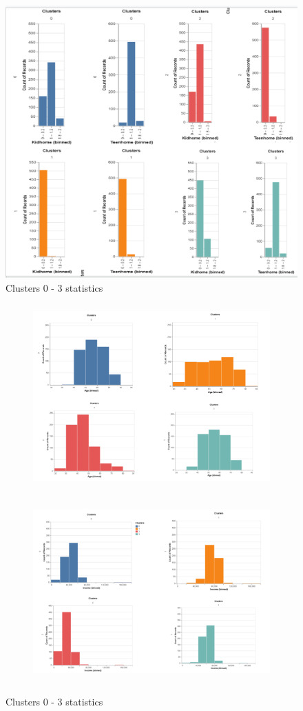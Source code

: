 \documentclass[12pt]{article}
\begin{document}
\begin{figure}[H]
    \centering
    \includegraphics[scale = 0.25]{figures/Clusters_kids.png}
    \caption{Clusters 0 - 3 statistics}
\end{figure}
\begin{figure}[H]
    \begin{subfigure}{\textwidth}
        \centering
        \includegraphics[height=7cm]{figures/Clusters_age.PNG}\hfill
    \end{subfigure}
    \newline
    \begin{subfigure}{\textwidth}
        \centering
        \includegraphics[height=7cm]{figures/Clusters_income.PNG}\hfill
    \end{subfigure}
  \caption{Clusters 0 - 3 statistics}
\end{figure}
\end{document}

